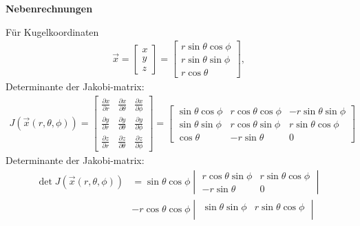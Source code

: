 \documentclass[11pt,a4paper]{scrartcl}
\begin{document}
\textbf{Nebenrechnungen}
\begin{tcolorbox}[title=Nebenrechnung Volumenselement, breakable]
    Für Kugelkoordinaten
    \begin{align*}
        \vec{x} = \begin{bmatrix}
            x\\y\\z
        \end{bmatrix}=\begin{bmatrix}
            r \sin{\theta} \cos{\phi}\\
            r \sin{\theta} \sin{\phi}\\
            r \cos{\theta}
        \end{bmatrix},              
    \end{align*}
    Determinante der Jakobi-matrix:
    \begin{align*}
        J(\vec{x}(r,\theta, \phi)) 
        = \begin{bmatrix}
            \frac{\partial x}{\partial r} & \frac{\partial x}{\partial \theta} & \frac{\partial x}{\partial \phi}\\
            \frac{\partial y}{\partial r} & \frac{\partial y}{\partial \theta} & \frac{\partial y}{\partial \phi}\\
            \frac{\partial z}{\partial r} & \frac{\partial z}{\partial \theta} & \frac{\partial z}{\partial \phi}
        \end{bmatrix}
        = \begin{bmatrix}
            \sin{\theta} \cos{\phi} & r \cos{\theta} \cos{\phi} & -r \sin{\theta} \sin{\phi}\\
            \sin{\theta} \sin{\phi} & r \cos{\theta} \sin{\phi} & r \sin{\theta} \cos{\phi}\\
            \cos{\theta} & - r \sin{\theta} & 0
        \end{bmatrix}
    \end{align*}
    Determinante der Jakobi-matrix:
    \begin{align*}
        \det{J(\vec{x}(r,\theta, \phi))} 
        &= \sin{\theta} \cos{\phi} \begin{vmatrix}
            r \cos{\theta} \sin{\phi} & r \sin{\theta} \cos{\phi}\\
            -r \sin{\theta} & 0
        \end{vmatrix} \\
        &- r \cos{\theta} \cos{\phi} \begin{vmatrix}
            \sin{\theta} \sin{\phi} &r \sin{\theta} \cos{\phi}\\

\end{vmatrix}
\end{align*}
\end{tcolorbox}
\end{document}
